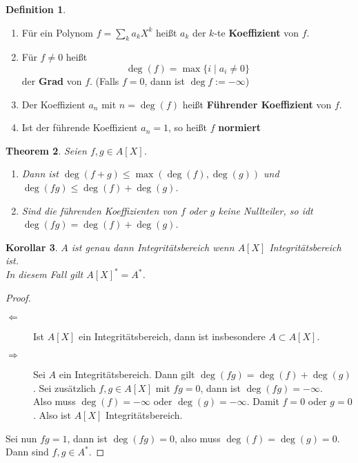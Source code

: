 \documentclass[10pt,a4paper]{article}
\theoremstyle{plain}
\newtheorem{theorem}{Theorem}[section]
\newtheorem{kor}[theorem]{Korollar}
\theoremstyle{definition}
\newtheorem{definition}[theorem]{Definition}
\theoremstyle{remark}
\begin{document}
	\begin{definition}
		\begin{enumerate}
			\item Für ein Polynom $f=\sum_ka_kX^k$ heißt $a_k$ der $k$-te \textbf{Koeffizient} von $f$.
			\item Für $f\neq0$ heißt
			\[\deg(f)=\max\{i\mid a_i\neq 0\}\]
			der \textbf{Grad} von $f$. (Falls $f=0$, dann ist $\deg f:=-\infty$)
			\item Der Koeffizient $a_n$ mit $n=\deg(f)$ heißt \textbf{Führender Koeffizient} von $f$.
			\item Ist der führende Koeffizient $a_n=1$, so heißt $f$ \textbf{normiert}
		\end{enumerate}
	\end{definition}

	\begin{theorem}
		Seien $f,g\in A[X]$. \begin{enumerate}
			\item Dann ist $\deg(f+g)\leq\max(\deg (f),\deg (g))$ und $\deg(fg)\leq\deg(f)+\deg(g)$.\\
			\item Sind die führenden Koeffizienten von $f$ oder $g$ keine Nullteiler, so idt $\deg(fg)=\deg(f)+\deg (g)$.
		\end{enumerate}
	\end{theorem}

	\begin{kor}\label{kor:IBPily1V}
		$A$ ist genau dann Integritätsbereich wenn $A[X]$ Integritätsbereich ist.\\
		In diesem Fall gilt $A[X]^*=A^*$.
	\end{kor}
	\begin{proof}
		\begin{description}
			\item[$\Leftarrow$] Ist $A[X]$ ein Integritätsbereich, dann ist insbesondere $A\subset A[X]$.
			\item[$\Rightarrow$] Sei $A$ ein Integritätsbereich. Dann gilt $\deg(fg)=\deg(f)+\deg(g)$. Sei zusätzlich $f,g\in A[X]$ mit $fg=0$, dann ist $\deg(fg)=-\infty$.\\
			Also muss $\deg(f)=-\infty$ oder $\deg(g)=-\infty$. Damit $f=0$ oder $g=0$. Also ist $A[X]$ Integritätsbereich.
		\end{description}
		Sei nun $fg=1$, dann ist $\deg(fg)=0$, also muss $\deg(f)=\deg(g)=0$. Dann sind $f,g\in A^*$.
	\end{proof}
\end{document}

